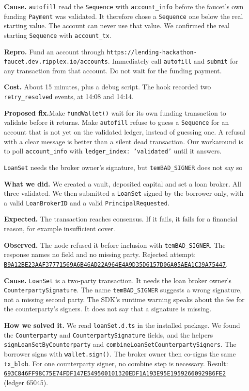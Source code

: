 \documentclass[10pt,a4paper]{article}
\newcommand{\finding}[4]{%
\par\vspace{7pt}\noindent\colorbox{forest}{\parbox{\dimexpr\linewidth-16pt\relax}{%
\vspace{5pt}\hspace{6pt}{\color{matcha}\bfseries\fontsize{8.5}{10}\selectfont FRICTION #1\hfill CATEGORY: #3\hspace{6pt}/\hspace{6pt}SEVERITY: #4\hspace{6pt}}\par
\vspace{4pt}\hspace{6pt}\parbox{\dimexpr\linewidth-14pt\relax}{\color{cream}\displayfont\fontsize{13}{16}\selectfont #2}\par\vspace{6pt}}}\par\vspace{3pt}}
\newcommand{\lbl}[1]{{\color{forest}\bfseries #1}\hspace{4pt}}
\newcommand{\fix}[1]{\par\vspace{3pt}\noindent\colorbox{cream}{\parbox{\dimexpr\linewidth-16pt\relax}{\vspace{5pt}\hspace{5pt}\parbox{\dimexpr\linewidth-14pt\relax}{{\color{forest}\bfseries Proposed fix.}\hspace{3pt}#1}\par\vspace{5pt}}}\par}
\newcommand{\tx}[1]{\href{https://custom.xrpl.org/lending-hackathon.dev.ripplex.io:51233/transactions/#1}{\texttt{\fontsize{7.4}{9}\selectfont #1}}}
\begin{document}
\lbl{Cause.} \texttt{autofill} read the \texttt{Sequence} with \texttt{account\_info} before the faucet's own funding \texttt{Payment} was validated. It therefore chose a \texttt{Sequence} one below the real starting value. The account can never use that value. We confirmed the real starting \texttt{Sequence} with \texttt{account\_tx}.

\lbl{Repro.} Fund an account through \texttt{https://lending-hackathon-faucet.dev.ripplex.io/accounts}. Immediately call \texttt{autofill} and \texttt{submit} for any transaction from that account. Do not wait for the funding payment.

\lbl{Cost.} About 15 minutes, plus a debug script. The hook recorded two \texttt{retry\_resolved} events, at 14:08 and 14:14.

\fix{Make \texttt{fundWallet()} wait for its own funding transaction to validate before it returns. Make \texttt{autofill} refuse to guess a \texttt{Sequence} for an account that is not yet on the validated ledger, instead of guessing one. A refusal with a clear message is better than a silent dead transaction. Our workaround is to poll \texttt{account\_info} with \texttt{ledger\_index: 'validated'} until it answers.}

\finding{2}{\texttt{LoanSet} needs the broker owner's signature, but \texttt{temBAD\_SIGNER} does not say so}{client libraries}{high}

\lbl{What we did.} We created a vault, deposited capital and set a loan broker. All three validated. We then submitted a \texttt{LoanSet} signed by the borrower only, with a valid \texttt{LoanBrokerID} and a valid \texttt{PrincipalRequested}.

\lbl{Expected.} The transaction reaches consensus. If it fails, it fails for a financial reason, for example insufficient cover.

\lbl{Observed.} The node refused it before inclusion with \texttt{temBAD\_SIGNER}. The response names no field and no missing party. Rejected attempt: \tx{B9A12BE23AAF37771569A6B46AD22A964E4A9D35D6157D06A05AEA1C39A75447}.

\lbl{Cause.} \texttt{LoanSet} is a two-party transaction. It needs the loan broker owner's \texttt{CounterpartySignature}. The name \texttt{temBAD\_SIGNER} suggests a wrong signature, not a missing second party. The SDK's runtime warning speaks about the fee for the counterparty's signers. It does not say that a signature is missing.

\lbl{How we solved it.} We read \texttt{loanSet.d.ts} in the installed package. We found the \texttt{Counterparty} and \texttt{CounterpartySignature} fields, and the helpers \texttt{signLoanSetByCounterparty} and \texttt{combineLoanSetCounterpartySigners}. The borrower signs with \texttt{wallet.sign()}. The broker owner then co-signs the same \texttt{tx\_blob}. For one counterparty signer, no combine step is necessary. Result: \tx{693C846FF98C75E74FDF147E549500101320EDF1A193E95E19592660929B6FE2} (ledger 65045).
\end{document}
